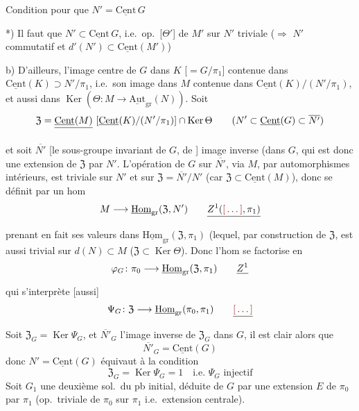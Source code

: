 \documentclass[11pt,a4paper]{article}
\begin{document}

Condition pour que $N' = \underline{\mathrm{Cent}}\, G$

*) Il faut que $N' \subset \underline{\mathrm{Cent}}\, G$, i.e.\ op.\ [$\Theta'$] de $M'$ sur $N'$ triviale ($\Longrightarrow$ $N'$ commutatif et $d'(N') \subset \underline{\mathrm{Cent}}(M')$)

b) D'ailleurs, l'image  centre de $G$ dans $K$ [$= G/\pi_1$] \struck{\ill{}} contenue dans $\underline{\mathrm{Cent}}(K) \supset N'/\pi_1$, i.e.\ son image dans $M$ contenue dans $\underline{\mathrm{Cent}}(K)/(N'/\pi_1)$, et aussi dans $\operatorname{Ker}(\Theta \colon M \to \underline{\mathrm{Aut}}_{\mathrm{gr}}(N))$. Soit
\[
  \mathfrak{Z} = \struck{\underline{\mathrm{Cent}}(M)}\ [\underline{\mathrm{Cent}}(K)/(N'/\pi_1)] \cap \operatorname{Ker}\Theta
  \qquad (N' \subset \underline{\mathrm{Cent}}(G) \subset \overline{N'})
\]

et soit $\overline{N'}$ [le sous-groupe invariant de $G$, de ]  image inverse (dans $G$, qui est donc une extension de $\mathfrak{Z}$ par $N'$. L'opération de $G$ sur $\overline{N'}$, via $M$, par automorphismes  intérieurs, est triviale sur $N'$ et sur $\mathfrak{Z} = \overline{N'}/N'$ (car $\mathfrak{Z} \subset \underline{\mathrm{Cent}}(M)$), donc se définit par un hom
\[
  M \longrightarrow \underline{\mathrm{Hom}}_{\mathrm{gr}}(\mathfrak{Z}, N') \qquad \struck{Z^{1}(\ill{}, \pi_1)}
\]
prenant en fait ses valeurs dans $\underline{\mathrm{Hom}}_{\mathrm{gr}}(\mathfrak{Z}, \pi_1)$ (lequel, par construction de $\mathfrak{Z}$, est aussi trivial sur $d(N) \subset M$ ($\mathfrak{Z} \subset \operatorname{Ker}\Theta$). Donc l'hom se factorise en
\[
  \varphi_G \colon \pi_0 \longrightarrow \underline{\mathrm{Hom}}_{\mathrm{gr}}(\mathfrak{Z}, \pi_1) \qquad \struck{Z^{1}}
\]
qui s'interprète [aussi] 
\[
  \Psi_G \colon \mathfrak{Z} \longrightarrow \underline{\mathrm{Hom}}_{\mathrm{gr}}(\pi_0, \pi_1) \qquad \struck{\ill{}}
\]
Soit $\mathfrak{Z}_G = \operatorname{Ker}\Psi_G$, et $\overline{N'}_G$ l'image inverse de $\mathfrak{Z}_G$ dans $G$, il est clair alors que
\[
  \overline{N'}_G = \underline{\mathrm{Cent}}(G)
\]
donc $N' = \underline{\mathrm{Cent}}(G)$ équivaut à la condition
\[
  \boxed{\mathfrak{Z}_G = \operatorname{Ker}\Psi_G = 1 \quad \text{i.e.\ } \Psi_G \text{ injectif}}
\]
Soit $G_1$ une deuxième sol.\ du pb initial, déduite de $G$ par une extension \struck{\ill{}} $E$ de $\pi_0$ par $\pi_1$ (op.\ triviale de $\pi_0$ sur $\pi_1$ i.e.\ extension centrale).
\end{document}
